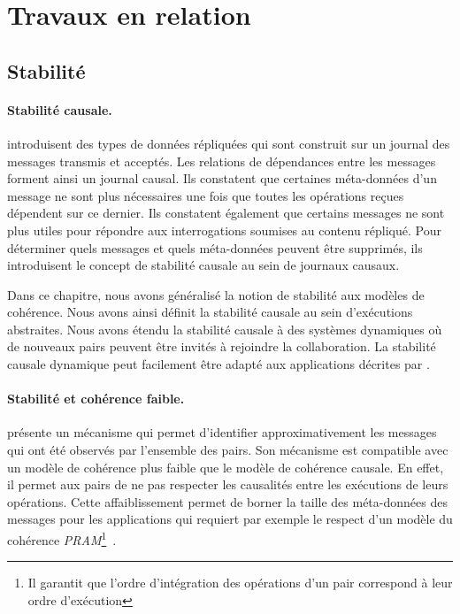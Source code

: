 \section{Travaux en relation}

\subsection{Stabilité}

\paragraph{Stabilité causale.} \textcite{baquero_2018_pure-op-crdt, baquero_2014_pure-op-crdt} introduisent des types de données répliquées qui sont construit sur un journal des messages transmis et acceptés.
Les relations de dépendances entre les messages forment ainsi un journal causal.
Ils constatent que certaines méta-données d'un message ne sont plus nécessaires une fois que toutes les opérations reçues dépendent sur ce dernier.
Ils constatent également que certains messages ne sont plus utiles pour répondre aux interrogations soumises au contenu répliqué.
Pour déterminer quels messages et quels méta-données peuvent être supprimés, ils introduisent le concept de stabilité causale au sein de journaux causaux.

Dans ce chapitre, nous avons généralisé la notion de stabilité aux modèles de cohérence.
Nous avons ainsi définit la stabilité causale au sein d'exécutions abstraites.
Nous avons étendu la stabilité causale à des systèmes dynamiques où de nouveaux pairs peuvent être invités à rejoindre la collaboration.
La stabilité causale dynamique peut facilement être adapté aux applications décrites par \textcite{baquero_2018_pure-op-crdt}.

\paragraph{Stabilité et cohérence faible.} \textcite{golding_1992_ackvector} présente un mécanisme qui permet d'identifier approximativement les messages qui ont été observés par l'ensemble des pairs.
Son mécanisme est compatible avec un modèle de cohérence plus faible que le modèle de cohérence causale.
En effet, il permet aux pairs de ne pas respecter les causalités entre les exécutions de leurs opérations.
Cette affaiblissement permet de borner la taille des méta-données des messages pour les applications qui requiert par exemple le respect d'un modèle du cohérence \emph{PRAM}\footnote{Il garantit que l'ordre d'intégration des opérations d'un pair correspond à leur ordre d'exécution}~\autocite{viotti_consistency_2016}.

